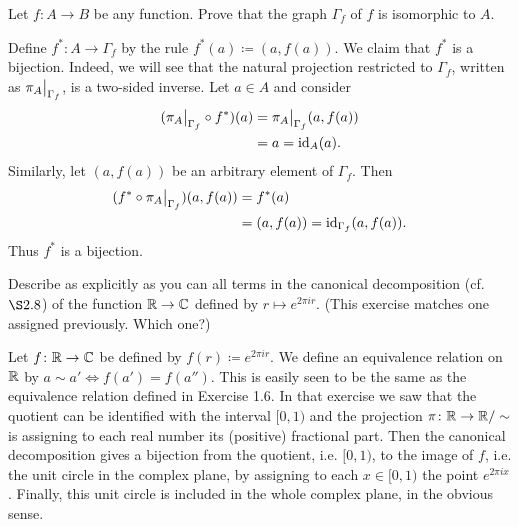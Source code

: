 \begin{exercise}
	Let \(f \colon A \to B\) be any function. Prove that the graph \(\Gamma_f\) of \(f\) is isomorphic to \(A\).
\end{exercise}
\begin{solution}
	Define $f^*\colon A \to \Gamma_f$ by the rule $f^*(a) \coloneqq (a,f(a))$. We claim that $f^*$ is a bijection. Indeed, we will see that the natural projection restricted to $\Gamma_f$, written as $\restr{\pi_A}{\Gamma_f}$, is a two-sided inverse. Let $a\in A$ and consider
	\begin{align*}
		(\restr{\pi_A}{\Gamma_f} \circ f^*)(a) &= \restr{\pi_A}{\Gamma_f}(a,f(a))\\
		&= a = \id_A(a).
	\end{align*}
	Similarly, let $(a,f(a))$ be an arbitrary element of $\Gamma_f$. Then
	\begin{align*}
		(f^*\circ \restr{\pi_A}{\Gamma_f})(a,f(a)) &= f^{*}(a)\\
		&= (a,f(a)) = \id_{\Gamma_f}(a,f(a)).
	\end{align*}
	Thus $f^*$ is a bijection.
\end{solution}

\begin{exercise}
	Describe as explicitly as you can all terms in the canonical decomposition (cf. \(\S 2.8\)) of the function \(\mathbb{R} \to \mathbb{C}\) defined by \(r \mapsto e^{2\pi ir}\). (This exercise matches one assigned previously. Which one?)
\end{exercise}
\begin{solution}
	Let $f \colon \mathbb{R} \to \mathbb{C}$ be defined by $f(r) \coloneqq e^{2\pi i r}$. We define an equivalence relation on $\mathbb{R}$ by $a\sim a' \iff f(a') = f(a'')$. This is easily seen to be the same as the equivalence relation defined in Exercise 1.6. In that exercise we saw that the quotient can be identified with the interval $[0,1)$ and the projection $\pi \colon \mathbb{R} \to \mathbb{R}/\sim$ is assigning to each real number its (positive) fractional part. Then the canonical decomposition gives a bijection from the quotient, i.e. $[0,1)$, to the image of $f$, i.e. the unit circle in the complex plane, by assigning to each $x \in [0,1)$ the point $e^{2\pi ix}$. Finally, this unit circle is included in the whole complex plane, in the obvious sense.
\end{solution}

